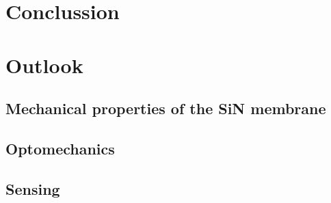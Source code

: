 \section{Conclussion}

\section{Outlook}

\subsection{Mechanical properties of the SiN membrane}

\subsection{Optomechanics}

\subsection{Sensing}